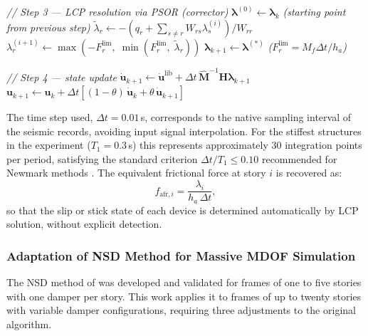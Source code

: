 \documentclass[preprint,12pt,authoryear]{elsarticle}
\newcommand{\Mf}{M_{\!f}}
\newcommand{\ha}{h_a}
\begin{document}
\begin{algorithm}[t]
\begin{algorithmic}[1]
    \vspace{2pt}
    \State \textit{// Step 3 — LCP resolution via PSOR (corrector)}
    \State $\bm{\lambda}^{(0)} \leftarrow \bm{\lambda}_k$
           \quad\textit{(starting point from previous step)}
            \State $\tilde{\lambda}_r \leftarrow
                   -\!\left(q_r + \sum_{s \neq r} W_{rs}\lambda_s^{(i)}\right)\!\big/W_{rr}$
            \State $\lambda_r^{(i+1)} \leftarrow
                   \max\!\left(-F^{\lim}_r,\;\min\!\left(F^{\lim}_r,\;\tilde{\lambda}_r\right)\right)$
        \EndFor
    \EndWhile
    \State $\bm{\lambda}_{k+1} \leftarrow \bm{\lambda}^{(*)}$
           \quad\textit{($F^{\lim}_r = \Mf\Delta t/\ha$)}

    \vspace{2pt}
    \State \textit{// Step 4 — state update}
    \State $\dot{\bm{u}}_{k+1} \leftarrow
           \dot{\bm{u}}^{\mathrm{lib}} +
           \Delta t\,\hat{\bm{M}}^{-1}\bm{H}\bm{\lambda}_{k+1}$
    \State $\bm{u}_{k+1} \leftarrow \bm{u}_k +
           \Delta t\!\left[(1-\theta)\,\dot{\bm{u}}_k +
                           \theta\,\dot{\bm{u}}_{k+1}\right]$
\EndFor
\end{algorithmic}
\end{algorithm}

The time step used, $\Delta t = 0.01$\,s, corresponds to the native sampling interval of the seismic
records, avoiding input signal interpolation. For the stiffest structures in the experiment
($T_1 = 0.3$\,s) this represents approximately 30 integration points per period, satisfying the standard
criterion $\Delta t / T_1 \leq 0.10$ recommended for Newmark methods \citep{chopra_dynamics_2015}.
The equivalent frictional force at story $i$ is recovered as:
\begin{equation}
    f_{\mathrm{afr},i} = \frac{\lambda_i}{\ha\,\Delta t},
    \label{eq:ffrict}
\end{equation}
so that the slip or stick state of each device is determined automatically by LCP solution, without
explicit detection.

\subsubsection*{Adaptation of NSD Method for Massive MDOF Simulation}
\label{sec:theory:nsd:adaptacion}

The NSD method of \citet{Namorado2024} was developed and validated for frames of one to five stories
with one damper per story. This work applies it to frames of up to twenty stories with variable damper
configurations, requiring three adjustments to the original algorithm.
\end{document}
